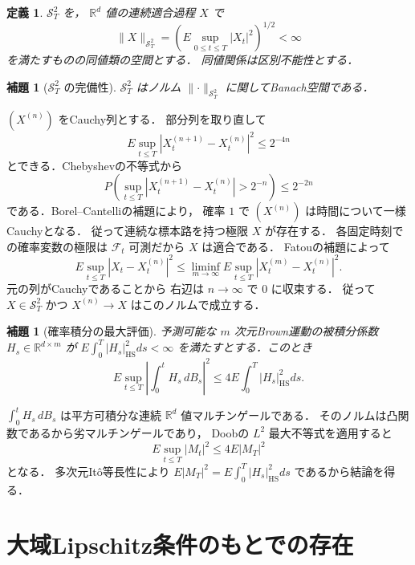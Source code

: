 \documentclass[a5paper,10pt,onecolumn]{jsarticle}
\makeatletter
\theoremstyle{mathnotetheorem}
\newtheorem{definition}[theorem]{定義}
\newtheorem{lemma}[theorem]{補題}
\renewcommand{\proofname}{証明}
\renewenvironment{proof}[1][\proofname]{%
  \par\pushQED{\qed}\normalfont\topsep4\p@\@plus2\p@\relax
  \trivlist\item[\hskip\labelsep\bfseries #1]\ignorespaces
}{\popQED\endtrivlist\@endpefalse}
\newcommand{\norm}[1]{\lVert #1\rVert}
\makeatother
\begin{document}
\begin{definition}
$\mathcal S^2_T$ を，
$\mathbb R^d$ 値の連続適合過程 $X$ で
\[
 \norm X_{\mathcal S^2_T}
 =\left(E\sup_{0\le t\le T}|X_t|^2\right)^{1/2}<\infty
\]
を満たすものの同値類の空間とする．
同値関係は区別不能性とする．
\end{definition}

\begin{lemma}[$\mathcal S^2_T$ の完備性]\label{lem:s2}
$\mathcal S^2_T$ はノルム
$\norm{\cdot}_{\mathcal S^2_T}$ に関してBanach空間である．
\end{lemma}
\begin{proof}
$(X^{(n)})$ をCauchy列とする．
部分列を取り直して
\[
 E\sup_{t\le T}|X^{(n+1)}_t-X^{(n)}_t|^2
 \le2^{-4n}
\]
とできる．Chebyshevの不等式から
\[
 P\left(\sup_{t\le T}|X^{(n+1)}_t-X^{(n)}_t|>2^{-n}\right)
 \le2^{-2n}
\]
である．Borel--Cantelliの補題により，
確率 $1$ で $(X^{(n)})$ は時間について一様Cauchyとなる．
従って連続な標本路を持つ極限 $X$ が存在する．
各固定時刻での確率変数の極限は $\mathcal F_t$ 可測だから
$X$ は適合である．
Fatouの補題によって
\[
 E\sup_{t\le T}|X_t-X^{(n)}_t|^2
 \le\liminf_{m\to\infty}
 E\sup_{t\le T}|X^{(m)}_t-X^{(n)}_t|^2.
\]
元の列がCauchyであることから
右辺は $n\to\infty$ で $0$ に収束する．
従って $X\in\mathcal S^2_T$ かつ
$X^{(n)}\to X$ はこのノルムで成立する．
\end{proof}

\begin{lemma}[確率積分の最大評価]\label{lem:sde-est}
予測可能な $m$ 次元Brown運動の被積分係数
$H_s\in\mathbb R^{d\times m}$ が
$E\int_0^T|H_s|_{\mathrm{HS}}^2ds<\infty$
を満たすとする．このとき
\[
 E\sup_{t\le T}\left|\int_0^tH_s\,dB_s\right|^2
 \le4E\int_0^T|H_s|_{\mathrm{HS}}^2ds.
\]
\end{lemma}
\begin{proof}
$\int_0^tH_s\,dB_s$ は平方可積分な連続
$\mathbb R^d$ 値マルチンゲールである．
そのノルムは凸関数であるから劣マルチンゲールであり，
Doobの $L^2$ 最大不等式を適用すると
\[
 E\sup_{t\le T}|M_t|^2\le4E|M_T|^2
\]
となる．
多次元It\^o等長性により
$E|M_T|^2=E\int_0^T|H_s|_{\mathrm{HS}}^2ds$
であるから結論を得る．
\end{proof}

\section{大域Lipschitz条件のもとでの存在}
\end{document}
